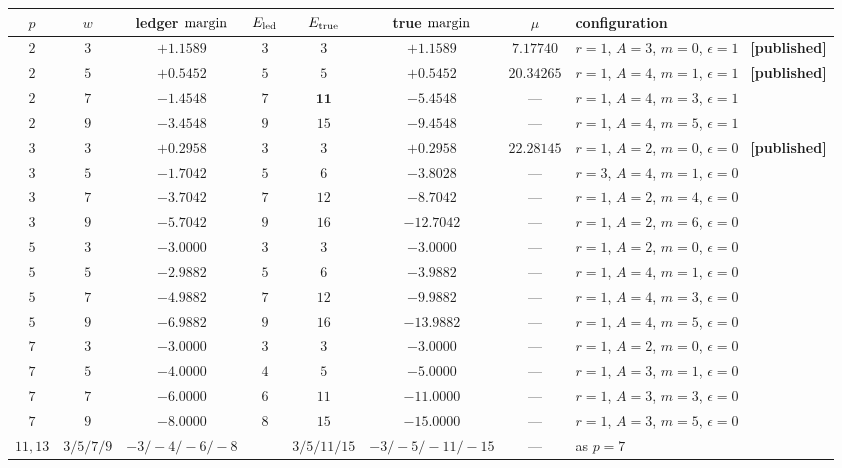 \begin{finding}\label{find:map2}
\begin{center}
\scriptsize\setlength{\tabcolsep}{3.5pt}
\begin{tabular}{cccccccl}
\toprule
$p$ & $w$ & ledger $\operatorname{margin}$ & $E_{\mathrm{led}}$ & $E_{\mathrm{true}}$ & \textbf{true} $\operatorname{margin}$ & $\mu$ & configuration\\
\midrule
$2$ & $3$ & $+1.1589$ & $3$ & $3$ & $\mathbf{+1.1589}$ & $7.17740$ & $r{=}1$, $A{=}3$, $m{=}0$, $\epsilon{=}1$ \ \textbf{[published]}\\
$2$ & $5$ & $+0.5452$ & $5$ & $5$ & $\mathbf{+0.5452}$ & $20.34265$ & $r{=}1$, $A{=}4$, $m{=}1$, $\epsilon{=}1$ \ \textbf{[published]}\\
$2$ & $7$ & $-1.4548$ & $7$ & $\mathbf{11}$ & $\mathbf{-5.4548}$ & --- & $r{=}1$, $A{=}4$, $m{=}3$, $\epsilon{=}1$\\
$2$ & $9$ & $-3.4548$ & $9$ & $15$ & $-9.4548$ & --- & $r{=}1$, $A{=}4$, $m{=}5$, $\epsilon{=}1$\\
$3$ & $3$ & $+0.2958$ & $3$ & $3$ & $\mathbf{+0.2958}$ & $22.28145$ & $r{=}1$, $A{=}2$, $m{=}0$, $\epsilon{=}0$ \ \textbf{[published]}\\
$3$ & $5$ & $-1.7042$ & $5$ & $6$ & $\mathbf{-3.8028}$ & --- & $r{=}3$, $A{=}4$, $m{=}1$, $\epsilon{=}0$\\
$3$ & $7$ & $-3.7042$ & $7$ & $12$ & $-8.7042$ & --- & $r{=}1$, $A{=}2$, $m{=}4$, $\epsilon{=}0$\\
$3$ & $9$ & $-5.7042$ & $9$ & $16$ & $-12.7042$ & --- & $r{=}1$, $A{=}2$, $m{=}6$, $\epsilon{=}0$\\
$5$ & $3$ & $-3.0000$ & $3$ & $3$ & $\mathbf{-3.0000}$ & --- & $r{=}1$, $A{=}2$, $m{=}0$, $\epsilon{=}0$\\
$5$ & $5$ & $-2.9882$ & $5$ & $6$ & $-3.9882$ & --- & $r{=}1$, $A{=}4$, $m{=}1$, $\epsilon{=}0$\\
$5$ & $7$ & $-4.9882$ & $7$ & $12$ & $-9.9882$ & --- & $r{=}1$, $A{=}4$, $m{=}3$, $\epsilon{=}0$\\
$5$ & $9$ & $-6.9882$ & $9$ & $16$ & $-13.9882$ & --- & $r{=}1$, $A{=}4$, $m{=}5$, $\epsilon{=}0$\\
$7$ & $3$ & $-3.0000$ & $3$ & $3$ & $\mathbf{-3.0000}$ & --- & $r{=}1$, $A{=}2$, $m{=}0$, $\epsilon{=}0$\\
$7$ & $5$ & $-4.0000$ & $4$ & $5$ & $-5.0000$ & --- & $r{=}1$, $A{=}3$, $m{=}1$, $\epsilon{=}0$\\
$7$ & $7$ & $-6.0000$ & $6$ & $11$ & $-11.0000$ & --- & $r{=}1$, $A{=}3$, $m{=}3$, $\epsilon{=}0$\\
$7$ & $9$ & $-8.0000$ & $8$ & $15$ & $-15.0000$ & --- & $r{=}1$, $A{=}3$, $m{=}5$, $\epsilon{=}0$\\
$11,13$ & $3/5/7/9$ & $-3/{-}4/{-}6/{-}8$ & & $3/5/11/15$ & $-3/{-}5/{-}11/{-}15$ & --- & as $p=7$\\
\bottomrule
\end{tabular}
\end{center}
\end{finding}

